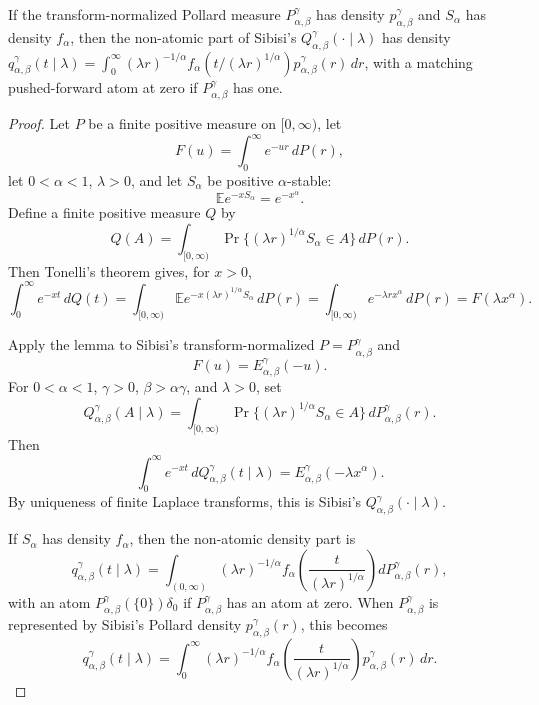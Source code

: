 \begin{proposition}
\label{res:prabhakar-q-density-mixture-formula}
If the transform-normalized Pollard measure \(P^\gamma_{\alpha,\beta}\) has density \(p^\gamma_{\alpha,\beta}\) and \(S_\alpha\) has density \(f_\alpha\), then the non-atomic part of Sibisi's \(Q^\gamma_{\alpha,\beta}(\cdot\mid\lambda)\) has density \(q^\gamma_{\alpha,\beta}(t\mid\lambda)=\int_0^\infty (\lambda r)^{-1/\alpha}f_\alpha(t/(\lambda r)^{1/\alpha})p^\gamma_{\alpha,\beta}(r)\,dr\), with a matching pushed-forward atom at zero if \(P^\gamma_{\alpha,\beta}\) has one.
\end{proposition}
\begin{proof}
Let \(P\) be a finite positive measure on \([0,\infty)\), let
\[
F(u)=\int_0^\infty e^{-ur}\,dP(r),
\]
let \(0<\alpha<1\), \(\lambda>0\), and let \(S_\alpha\) be positive \(\alpha\)-stable:
\[
\mathbb E e^{-xS_\alpha}=e^{-x^\alpha}.
\]
Define a finite positive measure \(Q\) by
\[
Q(A)=\int_{[0,\infty)}
\Pr\{(\lambda r)^{1/\alpha}S_\alpha\in A\}\,dP(r).
\]
Then Tonelli's theorem gives, for \(x>0\),
\[
\int_0^\infty e^{-xt}\,dQ(t)
=\int_{[0,\infty)}
\mathbb E e^{-x(\lambda r)^{1/\alpha}S_\alpha}\,dP(r)
=\int_{[0,\infty)}e^{-\lambda r x^\alpha}\,dP(r)
=F(\lambda x^\alpha).
\]

Apply the lemma to Sibisi's transform-normalized \(P=P^\gamma_{\alpha,\beta}\) and
\[
F(u)=E^\gamma_{\alpha,\beta}(-u).
\]
For \(0<\alpha<1\), \(\gamma>0\), \(\beta>\alpha\gamma\), and \(\lambda>0\), set
\[
Q^\gamma_{\alpha,\beta}(A\mid\lambda)
=\int_{[0,\infty)}
\Pr\{(\lambda r)^{1/\alpha}S_\alpha\in A\}\,
dP^\gamma_{\alpha,\beta}(r).
\]
Then
\[
\int_0^\infty e^{-xt}\,dQ^\gamma_{\alpha,\beta}(t\mid\lambda)
=E^\gamma_{\alpha,\beta}(-\lambda x^\alpha).
\]
By uniqueness of finite Laplace transforms, this is Sibisi's \(Q^\gamma_{\alpha,\beta}(\cdot\mid\lambda)\).

If \(S_\alpha\) has density \(f_\alpha\), then the non-atomic density part is
\[
q^\gamma_{\alpha,\beta}(t\mid\lambda)
=\int_{(0,\infty)}
(\lambda r)^{-1/\alpha}
f_\alpha\!\left(\frac{t}{(\lambda r)^{1/\alpha}}\right)
dP^\gamma_{\alpha,\beta}(r),
\]
with an atom \(P^\gamma_{\alpha,\beta}(\{0\})\delta_0\) if \(P^\gamma_{\alpha,\beta}\) has an atom at zero. When \(P^\gamma_{\alpha,\beta}\) is represented by Sibisi's Pollard density \(p^\gamma_{\alpha,\beta}(r)\), this becomes
\[
q^\gamma_{\alpha,\beta}(t\mid\lambda)
=\int_0^\infty
(\lambda r)^{-1/\alpha}
f_\alpha\!\left(\frac{t}{(\lambda r)^{1/\alpha}}\right)
p^\gamma_{\alpha,\beta}(r)\,dr.
\]


\end{proof}
